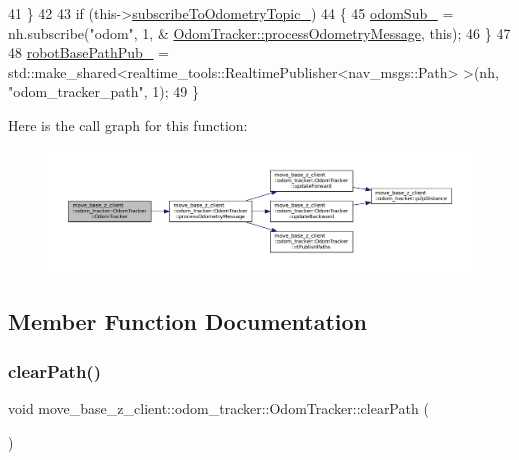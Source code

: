 \begin{DoxyCode}
41     \}
42 
43     \textcolor{keywordflow}{if} (this->\hyperlink{classmove__base__z__client_1_1odom__tracker_1_1OdomTracker_af07071223326ba38fc95037717102bb4}{subscribeToOdometryTopic\_})
44     \{
45         \hyperlink{classmove__base__z__client_1_1odom__tracker_1_1OdomTracker_a6a6b1dcb9f0cfae01007ca949b562ee2}{odomSub\_} = nh.subscribe(\textcolor{stringliteral}{"odom"}, 1, &
      \hyperlink{classmove__base__z__client_1_1odom__tracker_1_1OdomTracker_a79b9f1e3b15fa6ac82dd93ab78e23579}{OdomTracker::processOdometryMessage}, \textcolor{keyword}{this});
46     \}
47 
48     \hyperlink{classmove__base__z__client_1_1odom__tracker_1_1OdomTracker_a3eb6ca9be9504dc3c1da949d1e1daeda}{robotBasePathPub\_} = std::make\_shared<realtime\_tools::RealtimePublisher<nav\_msgs::Path>
      >(nh, \textcolor{stringliteral}{"odom\_tracker\_path"}, 1);
49 \}
\end{DoxyCode}
Here is the call graph for this function\+:
\nopagebreak
\begin{figure}[H]
\begin{center}
\leavevmode
\includegraphics[width=350pt]{classmove__base__z__client_1_1odom__tracker_1_1OdomTracker_ab6d1b57e311a9434a95c112e2f62501f_cgraph}
\end{center}
\end{figure}


\subsection{Member Function Documentation}
\mbox{\label{classmove__base__z__client_1_1odom__tracker_1_1OdomTracker_ae131b8bd2c3587b12cdc9b22699e8837}} 
\subsubsection{\texorpdfstring{clear\+Path()}{clearPath()}}
{\footnotesize\ttfamily void move\+\_\+base\+\_\+z\+\_\+client\+::odom\+\_\+tracker\+::\+Odom\+Tracker\+::clear\+Path (\begin{DoxyParamCaption}{ }\end{DoxyParamCaption})}



